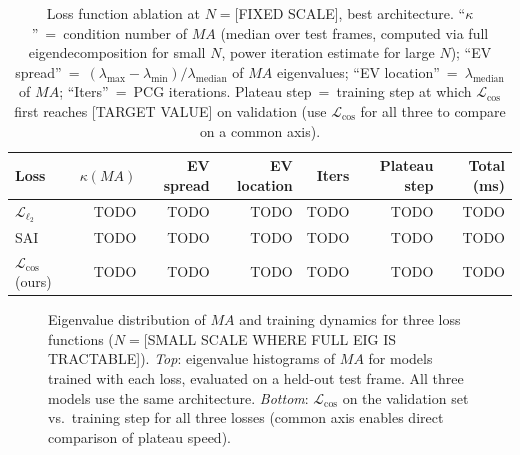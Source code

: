 \documentclass[acmtog,anonymous,review]{acmart}
\begin{document}
\begin{table}[h]
\centering
\caption{Loss function ablation at $N = $[FIXED SCALE], best architecture.
``$\kappa$''~=~condition number of $MA$ (median over test frames, computed via full eigendecomposition
for small $N$, power iteration estimate for large $N$);
``EV spread''~=~$({\lambda_{\max} - \lambda_{\min}})/{\lambda_{\mathrm{median}}}$ of $MA$ eigenvalues;
``EV location''~=~$\lambda_{\mathrm{median}}$ of $MA$; ``Iters''~=~PCG iterations.
Plateau step~=~training step at which $\mathcal{L}_{\mathrm{cos}}$ first reaches {[TARGET VALUE]}
on validation (use $\mathcal{L}_{\mathrm{cos}}$ for all three to compare on a common axis).}
\label{tab:ablation:loss}
\begin{tabular}{lrrrrrr}
\hline
Loss & $\kappa(MA)$ & EV spread & EV location & Iters & Plateau step & Total (ms) \\
\hline
$\mathcal{L}_{\ell_2}$ & TODO & TODO & TODO & TODO & TODO & TODO \\
SAI~\cite{yang2025sparse} & TODO & TODO & TODO & TODO & TODO & TODO \\
$\mathcal{L}_{\mathrm{cos}}$ (ours) & TODO & TODO & TODO & TODO & TODO & TODO \\
\hline
\end{tabular}
\end{table}

\begin{figure}[h]
  \centering
  \caption{Eigenvalue distribution of $MA$ and training dynamics for three loss functions
    ($N = $[SMALL SCALE WHERE FULL EIG IS TRACTABLE]).
    \emph{Top}: eigenvalue histograms of $MA$ for models trained with each loss, evaluated on a
    held-out test frame.  All three models use the same architecture.
    \emph{Bottom}: $\mathcal{L}_{\mathrm{cos}}$ on the validation set vs.\ training step for all
    three losses (common axis enables direct comparison of plateau speed).
  }
  \label{fig:loss:eigenvalues}
\end{figure}
\end{document}
